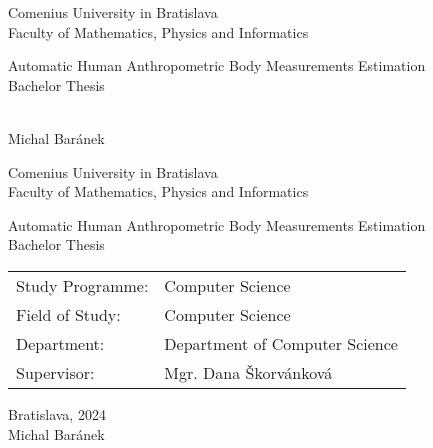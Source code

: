 \documentclass[12pt, twoside]{book}
\def\mfrok{2024}
\def\mfnazov{Automatic Human Anthropometric Body Measurements Estimation}
\def\mftyp{Bachelor Thesis}
\def\mfautor{Michal Baránek}
\def\mfskolitel{Mgr. Dana Škorvánková}
\def\mfkonzultant{tit. Meno Priezvisko, tit. }
\def\mfmiesto{Bratislava, \mfrok}
\def\mfodbor{Computer Science}
\def\program{Computer Science }
\def\mfpracovisko{ Department of Computer Science }
\begin{document}
     
\frontmatter
\pagestyle{empty}


\begin{center}
  \sc\large
  Comenius University in Bratislava\\
  Faculty of Mathematics, Physics and Informatics

\vfill

{\LARGE\mfnazov}\\
\mftyp
\end{center}

\vfill

{\sc\large 
\noindent \mfrok\\
\mfautor
}

\cleardoublepage


\noindent

\begin{center}
\sc  
\large
  Comenius University in Bratislava\\
  Faculty of Mathematics, Physics and Informatics

\vfill

{\LARGE\mfnazov}\\
\mftyp
\end{center}

\vfill

\noindent
\begin{tabular}{ll}
Study Programme: & \program \\
Field of Study: & \mfodbor \\
Department: & \mfpracovisko \\
Supervisor: & \mfskolitel \\
\end{tabular}

\vfill


\noindent \mfmiesto\\
\mfautor

\cleardoublepage



\newpage
\setcounter{page}{2}

\end{document}
